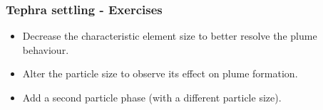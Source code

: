 \begin{frame}
  \frametitle{Tephra settling - Exercises}
 \begin{itemize}
    \item Decrease the characteristic element size to better resolve the plume behaviour.\newline
    \item Alter the particle size to observe its effect on plume formation.\newline
    \item Add a second particle phase (with a different particle size).
 \end{itemize}
\end{frame}



